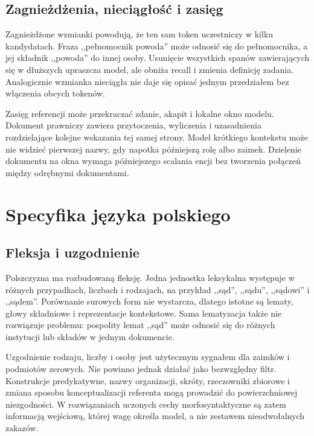 \subsection{Zagnieżdżenia, nieciągłość i zasięg}

Zagnieżdżone wzmianki powodują, że ten sam token uczestniczy w kilku kandydatach. Fraza ,,pełnomocnik powoda'' może odnosić się do pełnomocnika, a jej składnik ,,powoda'' do innej osoby. Usunięcie wszystkich spanów zawierających się w dłuższych upraszcza model, ale obniża recall i zmienia definicję zadania. Analogicznie wzmianka nieciągła nie daje się opisać jednym przedziałem bez włączenia obcych tokenów.

Zasięg referencji może przekraczać zdanie, akapit i lokalne okno modelu. Dokument prawniczy zawiera przytoczenia, wyliczenia i uzasadnienia rozdzielające kolejne wskazania tej samej strony. Model krótkiego kontekstu może nie widzieć pierwszej nazwy, gdy napotka późniejszą rolę albo zaimek. Dzielenie dokumentu na okna wymaga późniejszego scalania encji bez tworzenia połączeń między odrębnymi dokumentami.

\section{Specyfika języka polskiego}
\label{sec:polski-coref}

\subsection{Fleksja i uzgodnienie}

Polszczyzna ma rozbudowaną fleksję. Jedna jednostka leksykalna występuje w różnych przypadkach, liczbach i rodzajach, na przykład ,,sąd'', ,,sądu'', ,,sądowi'' i ,,sądem''. Porównanie surowych form nie wystarcza, dlatego istotne są lematy, głowy składniowe i reprezentacje kontekstowe. Sama lematyzacja także nie rozwiązuje problemu: pospolity lemat ,,sąd'' może odnosić się do różnych instytucji lub składów w jednym dokumencie.

Uzgodnienie rodzaju, liczby i osoby jest użytecznym sygnałem dla zaimków i podmiotów zerowych. Nie powinno jednak działać jako bezwzględny filtr. Konstrukcje predykatywne, nazwy organizacji, skróty, rzeczowniki zbiorowe i zmiana sposobu konceptualizacji referenta mogą prowadzić do powierzchniowej niezgodności. W rozwiązaniach uczonych cechy morfosyntaktyczne są zatem informacją wejściową, której wagę określa model, a nie zestawem nieodwołalnych zakazów.

